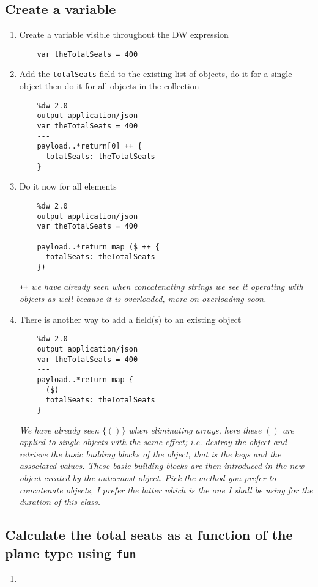 \subsection{Create a variable}
\begin{enumerate}[resume*]
\item Create a variable visible throughout the DW expression
  \begin{lstlisting}
    var theTotalSeats = 400
  \end{lstlisting}
\item Add the \texttt{totalSeats} field to the existing list of objects, do it for a single object then do it for all objects in the collection
  \begin{lstlisting}
    %dw 2.0
    output application/json
    var theTotalSeats = 400
    ---
    payload..*return[0] ++ {
      totalSeats: theTotalSeats
    }
  \end{lstlisting}
\item Do it now for all elements
  \begin{lstlisting}
    %dw 2.0
    output application/json
    var theTotalSeats = 400
    ---
    payload..*return map ($ ++ {
      totalSeats: theTotalSeats
    })
  \end{lstlisting}
  \emph{
    \texttt{++} we have already seen when concatenating strings we see it operating with objects as well because it is overloaded, more on overloading soon.
  }
\item There is another way to add a field(s) to an existing object
  \begin{lstlisting}
    %dw 2.0
    output application/json
    var theTotalSeats = 400
    ---
    payload..*return map {
      ($)
      totalSeats: theTotalSeats
    }
  \end{lstlisting}
  \emph{
    We have already seen $\{()\}$ when eliminating arrays, here these $()$ are applied to single objects with the same effect; i.e. destroy the object and retrieve the basic building blocks of the object, that is the keys and the associated values.  These basic building blocks are then introduced in the new object created by the outermost object.}
  \newline
  \emph{
    Pick the method you prefer to concatenate objects, I prefer the latter which is the one I shall be using for the duration of this class.
  }
\end{enumerate}

\subsection{Calculate the total seats as a function of the plane type using \texttt{fun}}
\begin{enumerate}[resume*]
\item
\end{enumerate}

